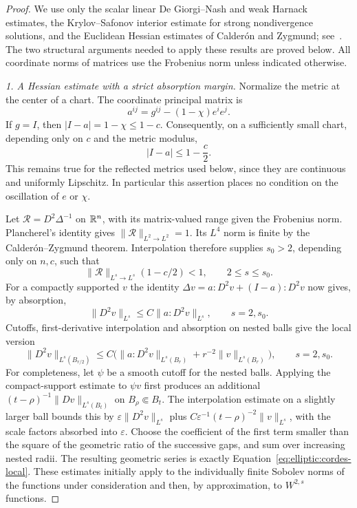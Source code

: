 \begin{proof}
We use only the scalar linear De Giorgi--Nash and weak Harnack estimates,
the Krylov--Safonov interior estimate for strong nondivergence solutions,
and the Euclidean Hessian estimates of Calder\'on and Zygmund;
see~\cite{GilbargTrudinger}.  The two structural
arguments needed to apply these results are proved below.  All coordinate
norms of matrices use the Frobenius norm unless indicated otherwise.

\medskip\noindent
\emph{1. A Hessian estimate with a strict absorption margin.}
Normalize the metric at the center of a chart.  The coordinate principal
matrix is
\[
 a^{ij}=g^{ij}-(1-\chi)e^i e^j.
\]
If $g=I$, then $|I-a|=1-\chi\leq1-c$.  Consequently, on a sufficiently
small chart, depending only on $c$ and the metric modulus,
\begin{equation}
 |I-a|\leq1-\frac c2.
 \label{eq:elliptic:cordes-margin}
\end{equation}
This remains true for the reflected metrics used below, since they are
continuous and uniformly Lipschitz.  In particular this assertion places
no condition on the oscillation of $e$ or $\chi$.

Let $\mathcal R=D^2\Delta^{-1}$ on $\mathbb R^n$, with its matrix-valued range
given the Frobenius norm.  Plancherel's identity gives
$\|\mathcal R\|_{L^2\to L^2}=1$.  Its $L^4$ norm is finite by the
Calder\'on--Zygmund theorem.  Interpolation therefore supplies
$s_0>2$, depending only on $n,c$, such that
\[
 \|\mathcal R\|_{L^s\to L^s}(1-c/2)<1,
 \qquad 2\leq s\leq s_0.
\]
For a compactly supported $v$ the identity
$\Delta v=a:D^2v+(I-a):D^2v$ now gives, by absorption,
\[
 \|D^2v\|_{L^s}\leq C\|a:D^2v\|_{L^s},
 \qquad s=2,s_0.
\]
Cutoffs, first-derivative interpolation and absorption on nested balls
give the local version
\begin{equation}
 \|D^2v\|_{L^s(B_{r/2})}
 \leq C\bigl(\|a:D^2v\|_{L^s(B_r)}
              +r^{-2}\|v\|_{L^s(B_r)}\bigr),
 \qquad s=2,s_0.
 \label{eq:elliptic:cordes-local}
\end{equation}
For completeness, let $\psi$ be a smooth cutoff for the nested balls.
Applying the compact-support estimate to $\psi v$ first produces an additional
$(t-\rho)^{-1}\|Dv\|_{L^s(B_t)}$ on $B_\rho\Subset B_t$.
The interpolation estimate on a slightly larger ball bounds this by
$\varepsilon\|D^2v\|_{L^s}$ plus
$C\varepsilon^{-1}(t-\rho)^{-2}\|v\|_{L^s}$, with the scale factors
absorbed into $\varepsilon$.  Choose the coefficient of the first term
smaller than the square of the geometric ratio of the successive gaps,
and sum over increasing nested radii.  The resulting geometric series
is exactly Equation~\eqref{eq:elliptic:cordes-local}.
These estimates initially apply to the individually finite Sobolev norms
of the functions under consideration and then, by approximation, to
$W^{2,s}$ functions.


\end{proof}
